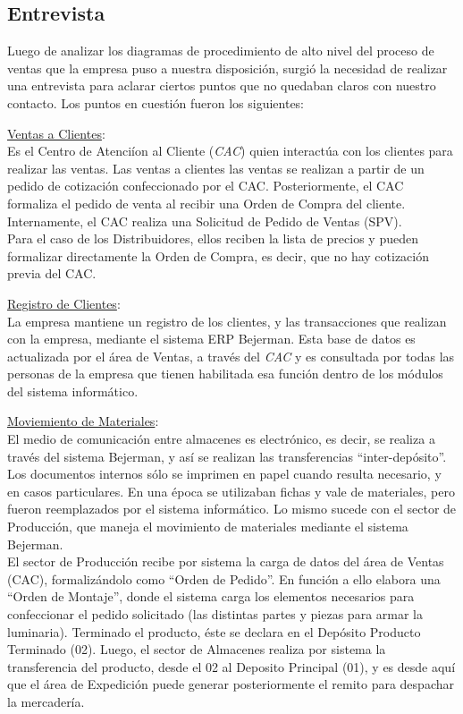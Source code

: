\subsection{Entrevista}
Luego de analizar los diagramas de procedimiento de alto nivel del proceso de ventas que la empresa puso a nuestra disposici\'on, surgi\'o la necesidad de realizar una entrevista para aclarar ciertos puntos que no quedaban claros con nuestro contacto. Los puntos en cuesti\'on fueron los siguientes:
\begin{description}
 \item \underline{Ventas a Clientes}: \\
	Es el Centro de Atenci\'ion al Cliente (\textit{CAC}) quien interact\'ua con los clientes para realizar las ventas. Las ventas a clientes las ventas se realizan a partir de un pedido de cotizaci\'on confeccionado por el CAC. Posteriormente, el CAC formaliza el pedido de venta al recibir una Orden de Compra del cliente. Internamente, el CAC realiza una Solicitud de Pedido de Ventas (SPV).  \\
	Para el caso de los Distribuidores, ellos reciben la lista de precios y pueden formalizar directamente la Orden de Compra, es decir, que no hay cotizaci\'on previa del CAC.
 \item \underline{Registro de Clientes}: \\
	La empresa mantiene un registro de los clientes, y las transacciones que realizan con la empresa, mediante el sistema ERP Bejerman. Esta base de datos es actualizada por el \'area de Ventas, a trav\'es del \textit{CAC} y es consultada por todas las personas de la empresa que tienen habilitada esa funci\'on dentro de los m\'odulos del sistema inform\'atico. 
 \item \underline{Moviemiento de Materiales}: \\
	El medio de comunicaci\'on entre almacenes es electr\'onico, es decir, se realiza a trav\'es del sistema Bejerman, y as\'i se realizan las transferencias ``inter-dep\'osito''. Los documentos internos s\'olo se imprimen en papel cuando resulta necesario, y en casos particulares. En una \'epoca se utilizaban fichas y vale de materiales, pero fueron reemplazados por el sistema inform\'atico. Lo mismo sucede con el sector de Producci\'on, que maneja el movimiento de materiales mediante el sistema Bejerman.\\
	El sector de Producci\'on recibe por sistema la carga de datos del \'area de Ventas (CAC), formaliz\'andolo como ``Orden de Pedido''. En funci\'on a ello elabora una ``Orden de Montaje'', donde el sistema carga los elementos necesarios para confeccionar el pedido solicitado (las distintas partes y piezas para armar la luminaria). Terminado el producto, \'este se declara en el Dep\'osito Producto Terminado (02). Luego, el sector de Almacenes realiza por sistema la transferencia del producto, desde el 02 al Deposito Principal (01), y es desde aqu\'i que el \'area de Expedici\'on puede generar posteriormente el remito para despachar la mercader\'ia.  

\end{description}
